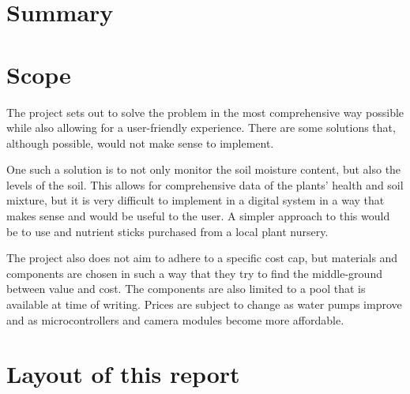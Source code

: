 \section{Summary}



\section{Scope}

The project sets out to solve the problem in the most comprehensive way possible while also allowing for a user-friendly experience. 
There are some solutions that, although possible, would not make sense to implement.

One such a solution is to not only monitor the soil moisture content, but also the \pH levels of the soil. 
This allows for comprehensive data of the plants' health and soil mixture, but it is very difficult to implement in a digital system in a way that makes sense and would be useful to the user.
A simpler approach to this would be to use \pH and nutrient sticks purchased from a local plant nursery.

The project also does not aim to adhere to a specific cost cap, but materials and components are chosen in such a way that they try to find the middle-ground between value and cost. The components are also limited to a pool that is available at time of writing. Prices are subject to change as water pumps improve and as microcontrollers and camera modules become more affordable.

\section{Layout of this report}

